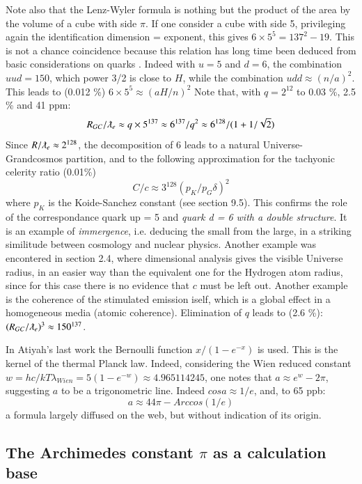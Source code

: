 \documentclass[twoside,draft]{article}
\begin{document}
\begin{sloppypar}
Note also that the Lenz-Wyler formula is nothing but the product of the area by the volume of a cube with side $\pi $. If one consider a cube with side 5, privileging again the identification dimension = exponent, this gives $6 \times 5^5 = 137^2 - 19 $. This is not a chance coincidence because this relation has long time been deduced from basic considerations on quarks \cite{Sanchez1}. Indeed with $u = 5 $ and $d = 6 $, the combination $uud = 150 $, which power 3/2 is close to $H$, while the combination $udd \approx (n/a)^2 $. This leads to (0.012 \%) $6\times 5^5 \approx (aH/n)^2 $  
Note that, with $q = 2^{12}$ to 0.03 \%, 2.5 \% and 41 ppm:
$$R_{GC}/\lambdabar_e \approx q\times 5^{137} \approx 6^{137}/q^2 \approx 6^{128}/(1+1/\sqrt2)$$
Since $R/\lambdabar_e \approx 2^{128}$, the decomposition of 6 leads to a natural Universe-Grandcosmos partition, and to the following approximation for the tachyonic celerity ratio (0.01\%) 
$$ C/c\approx3^{128} (p_K/p_G \delta)^2 $$ where $p_K$ is the Koide-Sanchez constant (see section 9.5). This confirms the role of the correspondance quark up = 5 and \textit{quark d = 6 with a double structure}. It is an example of \textit{immergence}, i.e. deducing the small from the large, in a striking similitude between cosmology and nuclear physics. Another example was encontered in section 2.4, where dimensional analysis gives the visible Universe radius, in an easier way than the equivalent one for the Hydrogen atom radius, since for this case there is no evidence that $c$ must be left out. Another example is the coherence of the stimulated emission iself, which is a global effect in a homogeneous media (atomic coherence).
Elimination of $q$ leads to (2.6 \%):
$(R_{GC}/\lambdabar_e)^3 \approx 150^{137}$. 

In Atiyah's last work the Bernoulli function $x/(1-e^{-x})$ is used. This is the kernel of the thermal Planck law. Indeed, considering the Wien reduced constant $w = hc/kT\lambda_{Wien} = 5 (1-e^{-w}) \approx 4.965114245$, one notes that $a \approx e^w -2\pi$, suggesting $a$ to be a trigonometric line. Indeed $cosa \approx 1/e$, and, to 65 ppb:
\begin{equation}
a \approx 44\pi - Arccos(1/e)
\end{equation}
a formula largely diffused on the web, but without indication of its origin.

\subsection {The Archimedes constant $\pi$ as a calculation base}


\end{sloppypar}
\end{document}
